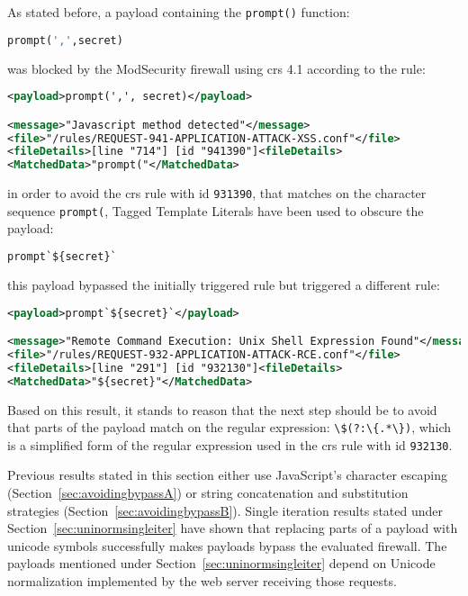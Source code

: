 \label{sec:forcedunicodenorm}
As stated before, a payload containing the \verb|prompt()| function:

\begin{lstlisting}[style=basicStyle, escapeinside=\^\^, language=Python]
prompt(',',secret)
\end{lstlisting}

was blocked by the ModSecurity firewall using \acrshort{crs} 4.1 according to the rule:

\begin{lstlisting}[style=ruleStyle, language=XML]
<payload>prompt(',', secret)</payload>

<message>"Javascript method detected"</message>
<file>"/rules/REQUEST-941-APPLICATION-ATTACK-XSS.conf"</file>
<fileDetails>[line "714"] [id "941390"]<fileDetails>
<MatchedData>"prompt("</MatchedData>
\end{lstlisting}

in order to avoid the \acrshort{crs} rule with id \verb|931390|, that matches on the character sequence \verb|prompt(|, Tagged Template Literals have been used to obscure the payload:

\begin{lstlisting}[style=basicStyle, escapeinside=\^\^, language=Python]
prompt`${secret}`
\end{lstlisting}

this payload bypassed the initially triggered rule but triggered a different rule:

\begin{lstlisting}[style=ruleStyle, language=XML]
<payload>prompt`${secret}`</payload>

<message>"Remote Command Execution: Unix Shell Expression Found"</message>
<file>"/rules/REQUEST-932-APPLICATION-ATTACK-RCE.conf"</file>
<fileDetails>[line "291"] [id "932130"]<fileDetails>
<MatchedData>"${secret}"</MatchedData>
\end{lstlisting}

Based on this result, it stands to reason that the next step should be to avoid that parts of the payload match on the regular expression: \verb|\$(?:\{.*\})|, which is a simplified form of the regular expression used in the \acrshort{crs} rule with id \verb|932130|.

Previous results stated in this section either use JavaScript's character escaping (Section~\ref{sec:avoidingbypassA}) or string concatenation and substitution strategies (Section~\ref{sec:avoidingbypassB}). Single iteration results stated under Section~\ref{sec:uninormsingleiter} have shown that replacing parts of a payload with unicode symbols successfully makes payloads bypass the evaluated firewall. The payloads mentioned under Section~\ref{sec:uninormsingleiter} depend on Unicode normalization implemented by the web server receiving those requests.


